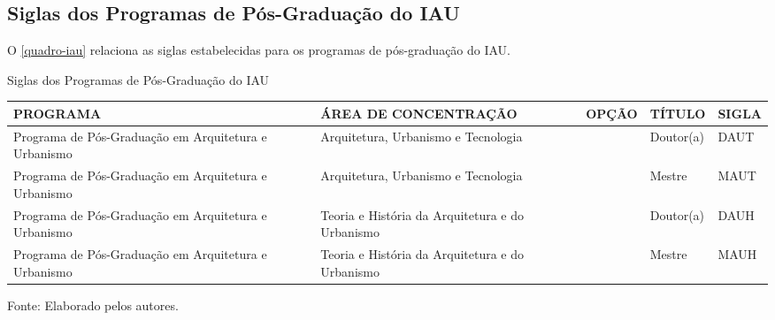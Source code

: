 \begin{apendicesenv}
\chapter{Siglas dos Programas de Pós-Graduação do IAU}
O \autoref{quadro-iau} relaciona as siglas estabelecidas para os programas de pós-graduação do IAU.
\begin{quadro}[htb]
\ABNTEXfontereduzida
\caption[Siglas dos Programas de Pós-Graduação do IAU]{Siglas dos Programas de Pós-Graduação do IAU}
\label{quadro-iau}
\begin{tabular}{|p{3.5cm}|p{3.5cm}|p{3.5cm}|p{1.5cm}|p{2.25cm}|}
  \hline
   \textbf{PROGRAMA} & \textbf{ÁREA DE CONCENTRAÇÃO} & \textbf{OPÇÃO} & \textbf{TÍTULO} & \textbf{SIGLA}  \\
    \hline
Programa de Pós-Graduação em Arquitetura e Urbanismo & Arquitetura, Urbanismo e Tecnologia &  & Doutor(a) & DAUT\\
Programa de Pós-Graduação em Arquitetura e Urbanismo & Arquitetura, Urbanismo e Tecnologia &  & Mestre & MAUT\\
Programa de Pós-Graduação em Arquitetura e Urbanismo & Teoria e História da Arquitetura e do Urbanismo &  & Doutor(a) & DAUH\\
Programa de Pós-Graduação em Arquitetura e Urbanismo & Teoria e História da Arquitetura e do Urbanismo &  & Mestre & MAUH\\
    \hline

\end{tabular}
\begin{flushleft}
		Fonte: Elaborado pelos autores.\
\end{flushleft}
\end{quadro}


\end{apendicesenv}
